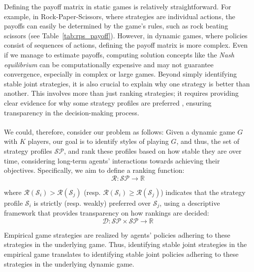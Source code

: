 \begin{flushleft}
\begin{flushleft}
        Defining the payoff matrix in static games is relatively straightforward. For example, in Rock-Paper-Scissors, where strategies are individual actions, the payoffs can easily be determined by the game’s rules, such as rock beating scissors (see Table~\ref{tab:rps_payoff}). However, in dynamic games, where policies consist of sequences of actions, defining the payoff matrix is more complex. Even if we manage to estimate payoffs, computing solution concepts like the \emph{Nash equilibrium} can be computationally expensive and may not guarantee convergence, especially in complex or large games. Beyond simply identifying stable joint strategies, it is also crucial to explain why one strategy is better than another. This involves more than just ranking strategies; it requires providing clear evidence for why some strategy profiles are preferred \cite{Vouros_2022}, ensuring transparency in the decision-making process.\\~\\

        We could, therefore, consider our problem as follows: Given a dynamic game $G$ with $K$ players, our goal is to identify styles of playing $G$, and thus, the set of strategy profiles $\mathcal{SP}$, and rank these profiles based on how stable they are over time, considering long-term agents' interactions towards achieving their objectives. Specifically, we aim to define a ranking function:
        \begin{equation}
            \mathcal{R}: \mathcal{SP} \to \mathbb{R}
            \label{eq:ranking_function}
        \end{equation}
        
        where $\mathcal{R}(\mathcal{S}_i) > \mathcal{R}(\mathcal{S}_j)$ (resp. $\mathcal{R}(\mathcal{S}_i) \geq \mathcal{R}(\mathcal{S}_j)$) indicates that the strategy profile $\mathcal{S}_i$ is strictly (resp. weakly) preferred over $\mathcal{S}_j$, using a descriptive framework that provides transparency on how rankings are decided:
        \begin{equation}
            \mathcal{D}: \mathcal{SP} \times \mathcal{SP} \to \mathbb{R}
            \label{eq:descriptive framework}
        \end{equation}

        Empirical game strategies are realized by agents' policies adhering to these strategies in the underlying game. Thus, identifying stable joint strategies in the empirical game translates to identifying stable joint policies adhering to these strategies in the underlying dynamic game.


\end{flushleft}
\end{flushleft}

